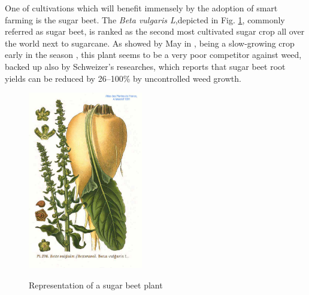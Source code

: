 One of cultivations which will benefit immensely by the adoption of smart farming is the sugar beet. The \textit{Beta vulgaris L},depicted in Fig. \ref{fig:sugar_beet}, commonly referred as sugar beet, is ranked as the second most cultivated  sugar crop all over the world next to sugarcane\cite{bhadra_weed_2020}. As showed by May in \cite{may_economic_2003}, being a slow-growing crop early in the season \cite{bhadra_weed_2020}, this plant seems to be a very poor competitor against weed, backed up also by Schweizer's researches, which reports that sugar beet root yields can be reduced by 26–100\% by uncontrolled weed growth.  \cite{schweizer_weed_1989}\\
\begin{figure}[ht]
	\centering
	\includegraphics[width = 5cm]{img/276_Beta_vulgaris_L.jpg}
	\caption[Representation of a sugar beet plant]{Representation of a sugar beet plant \cite{masclef_sugar_1891} }{\centering}
	\label{fig:sugar_beet}
\end{figure}

